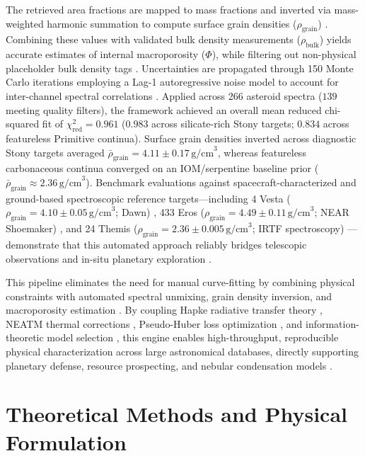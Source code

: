 \documentclass[11pt,a4paper]{article}
\begin{document}
The retrieved area fractions are mapped to mass fractions and inverted via mass-weighted harmonic summation to compute surface grain densities ($\rho_{\text{grain}}$) \cite{Consolmagno2008, Britt2003}. Combining these values with validated bulk density measurements ($\rho_{\text{bulk}}$) yields accurate estimates of internal macroporosity ($\Phi$), while filtering out non-physical placeholder bulk density tags \cite{Carry2012}. Uncertainties are propagated through 150 Monte Carlo iterations employing a Lag-1 autoregressive noise model to account for inter-channel spectral correlations \cite{Efron1993, Press2007}. Applied across 266 asteroid spectra ($139$ meeting quality filters), the framework achieved an overall mean reduced chi-squared fit of $\chi^2_{\text{red}} = 0.961$ ($0.983$ across silicate-rich Stony targets; $0.834$ across featureless Primitive continua). Surface grain densities inverted across diagnostic Stony targets averaged $\bar{\rho}_{\text{grain}} = 4.11 \pm 0.17\,\text{g/cm}^3$, whereas featureless carbonaceous continua converged on an IOM/serpentine baseline prior ($\bar{\rho}_{\text{grain}} \approx 2.36\,\text{g/cm}^3$). Benchmark evaluations against spacecraft-characterized and ground-based spectroscopic reference targets—including 4 Vesta ($\rho_{\text{grain}} = 4.10 \pm 0.05\,\text{g/cm}^3$; Dawn) \cite{Russell2012}, 433 Eros ($\rho_{\text{grain}} = 4.49 \pm 0.11\,\text{g/cm}^3$; NEAR Shoemaker) \cite{Veverka2001}, and 24 Themis ($\rho_{\text{grain}} = 2.36 \pm 0.005\,\text{g/cm}^3$; IRTF spectroscopy) \cite{Campins2010}—demonstrate that this automated approach reliably bridges telescopic observations and in-situ planetary exploration \cite{DeMeo2009, Britt2002, Lauretta2019, Watanabe2019}.

This pipeline eliminates the need for manual curve-fitting by combining physical constraints with automated spectral unmixing, grain density inversion, and macroporosity estimation \cite{Tarantola2005, Consolmagno2008, Carry2012}. By coupling Hapke radiative transfer theory \cite{Hapke1981, Hapke2012}, NEATM thermal corrections \cite{Harris1998}, Pseudo-Huber loss optimization \cite{Huber1964}, and information-theoretic model selection \cite{Akaike1974}, this engine enables high-throughput, reproducible physical characterization across large astronomical databases, directly supporting planetary defense, resource prospecting, and nebular condensation models \cite{DeMeo2009, Britt2002, Lauretta2019, Watanabe2019}.

\section{Theoretical Methods and Physical Formulation}
\end{document}
